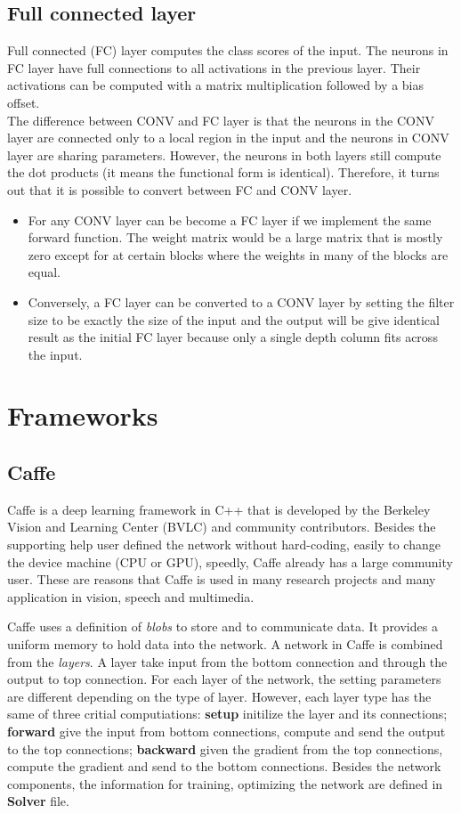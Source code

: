 \subsection{Full connected layer}
Full connected (FC) layer computes the class scores of the input. The neurons in FC layer have full connections to all activations in the previous layer. Their activations can be computed with a matrix multiplication followed by a bias offset.\\[0.2cm]
The difference between CONV and FC layer is that the neurons in the CONV layer are connected only to a local region in the input and the neurons in CONV layer are sharing parameters. However, the neurons in both layers still compute the dot products (it means the functional form is identical). Therefore, it turns out that it is possible to convert between FC and CONV layer.
\begin{itemize}
	\item For any CONV layer can be become a FC layer if we implement the same forward function. The weight matrix would be a large matrix that is mostly zero except for at certain blocks where the weights in many of the blocks are equal.
	\item Conversely, a FC layer can be converted to a CONV layer by setting the filter size to be exactly the size of the input and the output will be give identical result as the initial FC layer because only a single depth column fits across the input.
\end{itemize}
\section{Frameworks}
\subsection{Caffe}
Caffe is a deep learning framework in C++ that is developed by the Berkeley Vision and Learning Center (BVLC) and community contributors. Besides the supporting help user defined the network without hard-coding, easily to change the device machine (CPU or GPU), speedly, Caffe already has a large community user. These are reasons that Caffe is used in many research projects and many application in vision, speech and multimedia.

Caffe uses a definition of \textit{blobs} to store and to communicate data. It provides a uniform memory to hold data into the network. A network in Caffe is combined from the \textit{layers}. A layer take input from the bottom connection and through the output to top connection. For each layer of the network, the setting parameters are different depending on the type of layer. However, each layer type has the same of three critial computiations: \textbf{setup} initilize the layer and its connections; \textbf{forward} give the input from bottom connections, compute and send the output to the top connections; \textbf{backward} given the gradient from the top connections, compute the gradient and send to the bottom connections. Besides the network components, the information for training, optimizing the network are defined in \textbf{Solver} file.
